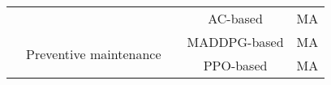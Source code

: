 \documentclass[acmsmall]{acmart}
\begin{document}
\begin{table}[]
\begin{tabularx}{\textwidth}{|XX|c|c|c|}
\multicolumn{1}{|X|}{}                                      &                                         &  \cite{9376433}                       & AC-based \cite{ac}         & MA       \\ \cline{2-5} 
\multicolumn{1}{|X|}{}                                      & \multirow{2}{=}{\centering Preventive maintenance} & \cite{SU2022116323}                             & MADDPG-based \cite{maddpg} & MA       \\ \cline{3-5} 
\multicolumn{1}{|X|}{}                                      &                                         & \cite{RUIZRODRIGUEZ2022102406}                  & PPO-based \cite{ppo}       & MA       \\ \hline
\end{tabularx}
\end{table}
\end{document}

